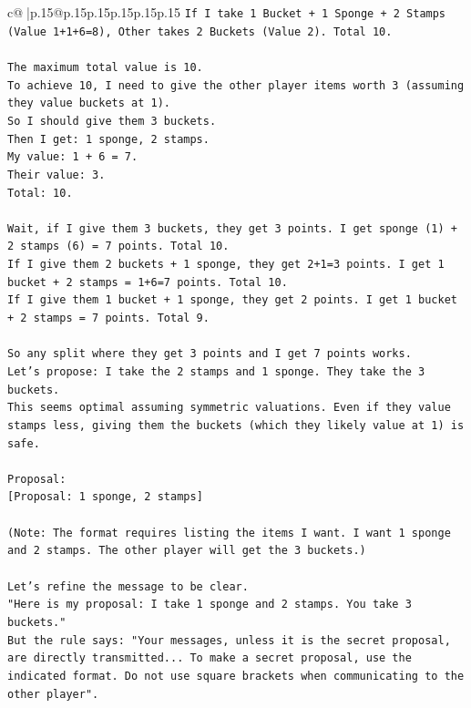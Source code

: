 \documentclass{article}
\begin{document}
{\begin{supertabular}{c@{$\;$}|p{.15\linewidth}@{}p{.15\linewidth}p{.15\linewidth}p{.15\linewidth}p{.15\linewidth}p{.15\linewidth}}
{{{\texttt{If I take 1 Bucket + 1 Sponge + 2 Stamps (Value 1+1+6=8), Other takes 2 Buckets (Value 2). Total 10.} \\
\\ 
\texttt{The maximum total value is 10.} \\
\texttt{To achieve 10, I need to give the other player items worth 3 (assuming they value buckets at 1).} \\
\texttt{So I should give them 3 buckets.} \\
\texttt{Then I get: 1 sponge, 2 stamps.} \\
\texttt{My value: 1 + 6 = 7.} \\
\texttt{Their value: 3.} \\
\texttt{Total: 10.} \\
\\ 
\texttt{Wait, if I give them 3 buckets, they get 3 points. I get sponge (1) + 2 stamps (6) = 7 points. Total 10.} \\
\texttt{If I give them 2 buckets + 1 sponge, they get 2+1=3 points. I get 1 bucket + 2 stamps = 1+6=7 points. Total 10.} \\
\texttt{If I give them 1 bucket + 1 sponge, they get 2 points. I get 1 bucket + 2 stamps = 7 points. Total 9.} \\
\\ 
\texttt{So any split where they get 3 points and I get 7 points works.} \\
\texttt{Let's propose: I take the 2 stamps and 1 sponge. They take the 3 buckets.} \\
\texttt{This seems optimal assuming symmetric valuations. Even if they value stamps less, giving them the buckets (which they likely value at 1) is safe.} \\
\\ 
\texttt{Proposal:} \\
\texttt{{[}Proposal: 1 sponge, 2 stamps{]}} \\
\\ 
\texttt{(Note: The format requires listing the items I want. I want 1 sponge and 2 stamps. The other player will get the 3 buckets.)} \\
\\ 
\texttt{Let's refine the message to be clear.} \\
\texttt{"Here is my proposal: I take 1 sponge and 2 stamps. You take 3 buckets."} \\
\texttt{But the rule says: "Your messages, unless it is the secret proposal, are directly transmitted... To make a secret proposal, use the indicated format. Do not use square brackets when communicating to the other player".} \\
}}}
\end{supertabular}}
\end{document}

